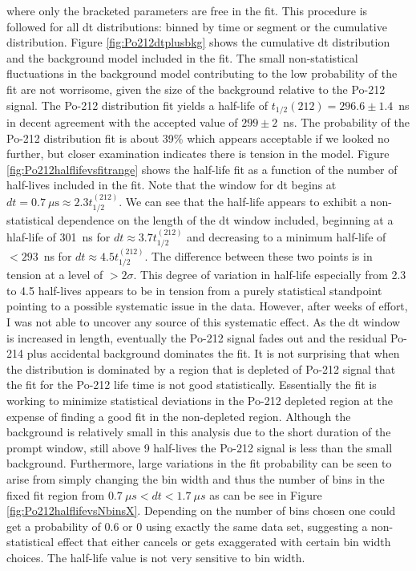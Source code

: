 where only the bracketed parameters are free in the fit. This procedure is followed for all dt distributions: binned by time or segment or the cumulative distribution. Figure \ref{fig:Po212dtplusbkg} shows the cumulative dt distribution and the background model included in the fit. The small non-statistical fluctuations in the background model contributing to the low probability of the fit are not worrisome, given the size of the background relative to the Po-212 signal. The Po-212 distribution fit yields a half-life of $t_{1/2}(212)=296.6\pm1.4$~ns in decent agreement with the accepted value of $299\pm2$~ns.  The probability of the Po-212 distribution fit is about 39\% which appears acceptable if we looked no further, but closer examination indicates there is tension in the model. Figure \ref{fig:Po212halflifevsfitrange} shows the half-life fit as a function of the number of half-lives included in the fit. Note that the window for dt begins at $dt=0.7~\mu\textrm{s}\approx2.3t_{1/2}^{(212)}$. We can see that the half-life appears to exhibit a non-statistical dependence on the length of the dt window included, beginning at a hlaf-life of 301~ns for $dt\approx3.7t_{1/2}^{(212)}$ and decreasing to a minimum half-life of $<293$~ns for $dt\approx4.5t_{1/2}^{(212)}$. The difference between these two points is in tension at a level of $>2\sigma$. This degree of variation in half-life especially from 2.3 to 4.5 half-lives appears to be in tension from a purely statistical standpoint pointing to a possible systematic issue in the data. However, after weeks of effort, I was not able to uncover any source of this systematic effect. As the dt window is increased in length, eventually the Po-212 signal fades out and the residual Po-214 plus accidental background dominates the fit. It is not surprising that when the distribution is dominated by a region that is depleted of Po-212 signal that the fit for the Po-212 life time is not good statistically. Essentially the fit is working to minimize statistical deviations in the Po-212 depleted region at the expense of finding a good fit in the non-depleted region. Although the background is relatively small in this analysis due to the short duration of the prompt window, still above 9 half-lives the Po-212 signal is less than the small background. Furthermore, large variations in the fit probability can be seen to arise from simply changing the bin width and thus the number of bins in the fixed fit region from $0.7~\mu s<dt<1.7~\mu s$ as can be see in Figure \ref{fig:Po212halflifevsNbinsX}. Depending on the number of bins chosen one could get a probability of 0.6 or 0 using exactly the same data set, suggesting a non-statistical effect that either cancels or gets exaggerated with certain bin width choices. The half-life value is not very sensitive to bin width. 
